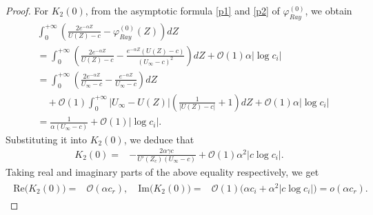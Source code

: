 \documentclass[10pt,a4paper]{amsart}
\begin{document}
\begin{proof}
For $K_2(0)$, from the asymptotic formula \eqref{p1} and \eqref{p2} of $\varphi^{(0)}_{Ray}$, we obtain
			\begin{align*}
				& \int_{0}^{+\infty}\left(\frac{2e^{-\alpha Z}}{U(Z)-c}-\varphi_{Ray}^{(0)}(Z)\right)dZ\\
				&=\int_{0}^{+\infty}\left(\frac{2e^{-\alpha Z}}{U(Z)-c}-\frac{e^{-\alpha Z}(U(Z)-c)}{(U_\infty-c)^2}\right)dZ+\mathcal{O}(1)\alpha|\log c_i|\\
				&=\int_{0}^{+\infty}\left(\frac{2e^{-\alpha Z}}{U_\infty-c}-\frac{e^{-\alpha Z}}{U_\infty-c}\right)dZ\\
				&\quad+\mathcal{O}(1)\int_{0}^{+\infty}|U_\infty-U(Z)|\left(\frac{1}{|U(Z)-c|}+1\right)dZ+\mathcal{O}(1)\alpha|\log c_i|\\
				&=\frac{1}{\alpha(U_\infty-c)}+\mathcal{O}(1)|\log c_i|.
			\end{align*}
		Substituting it into $K_{2}(0)$, we deduce that
			\begin{align*}
				K_2(0)= & -\frac{2\alpha\gamma c}{U'(Z_c)(U_\infty-c)}
				+\mathcal{O}(1)\alpha^2|c\log c_i|.
			\end{align*}
		Taking real and imaginary parts of the above equality respectively, we get
			\begin{align}\label{K2-0-im}\begin{aligned}
					\text{Re}\big(K_2(0)\big) =& \mathcal{O}(\alpha c_r),\quad
					\text{Im}\big(K_2(0)\big) =& \mathcal{O}(1)\big(\alpha c_i+\alpha^2|c\log c_i|\big)=o(\alpha c_r).
			\end{aligned}\end{align} 
		

\end{proof}
\end{document}
